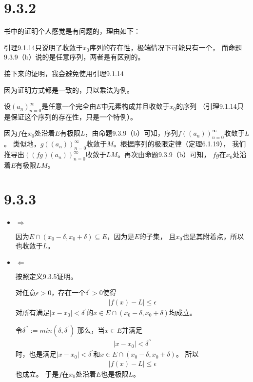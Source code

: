 \documentclass{article}
\begin{document}
\section*{9.3.2}

\begin{zremark}
  书中的证明个人感觉是有问题的，理由如下：

  引理9.1.14只说明了收敛于$x_0$序列的存在性，极端情况下可能只有一个，
  而命题9.3.9（b）说的是任意序列，两者是有区别的。

  接下来的证明，我会避免使用引理9.1.14
\end{zremark}

因为证明方式都是一致的，只以乘法为例。

设$(a_n)_{n=0}^\infty$是任意一个完全由$E$中元素构成并且收敛于$x_0$的序列
（引理9.1.14只是保证这个序列的存在性，只是一个特例）。

因为$f$在$x_0$处沿着$E$有极限$L$，由命题9.3.9（b）可知，序列$f((a_n))_{n=0}^\infty$收敛于$L$。
类似地，$g((a_n))_{n=0}^\infty$收敛于$M$。根据序列的极限定律（定理6.1.19），
我们推导出$((fg)(a_n))_{n=0}^\infty$收敛于$LM$。再次由命题9.3.9（b）可知，
$fg$在$x_0$处沿着$E$有极限$LM$。

\section*{9.3.3}

\begin{itemize}
  \item $\Rightarrow$

        因为$ E \cap (x_0 - \delta, x_0 + \delta) \subseteq E$，因为是$E$的子集，
        且$x_0$也是其附着点，所以也收敛于$L$。
  \item $\Leftarrow$

        按照定义9.3.5证明。

        对任意$\epsilon > 0$，存在一个$\delta^\prime > 0$使得
        \begin{align*}
          |f(x) - L| \leq \epsilon
        \end{align*}
        对所有满足$|x - x_0| < \delta^\prime$的$x \in E \cap (x_0 - \delta, x_0 + \delta)$均成立。

        令$\delta^{\prime\prime} := min(\delta, \delta^\prime)$
        那么，当$x \in E$并满足
        \begin{align*}
          |x - x_0| < \delta^{\prime\prime}
        \end{align*}
        时，也是满足$|x - x_0| < \delta^\prime$和$x \in E \cap (x_0 - \delta, x_0 + \delta)$。
        所以
        \begin{align*}
          |f(x) - L| \leq \epsilon
        \end{align*}
        也成立。
        于是$f$在$x_0$处沿着$E$也是极限$L$。
\end{itemize}
\end{document}
